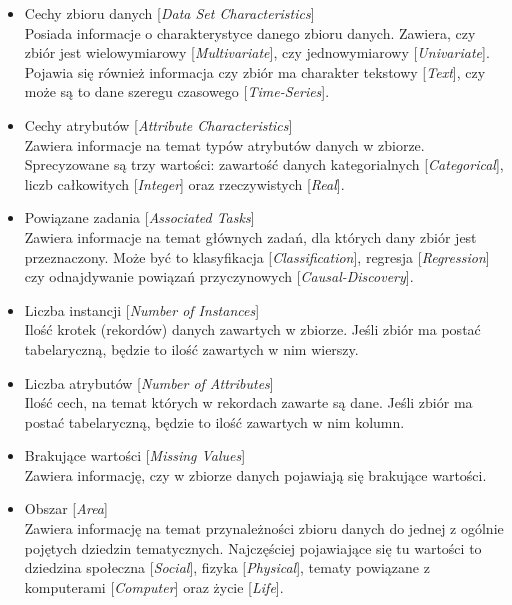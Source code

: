 \begin{itemize}
  \item Cechy zbioru danych [\emph{Data Set Characteristics}] \\
        Posiada informacje o charakterystyce danego zbioru danych.
        Zawiera, czy zbiór jest wielowymiarowy [\emph{Multivariate}], czy jednowymiarowy [\emph{Univariate}]\footnotemark.
        Pojawia się również informacja czy zbiór ma charakter tekstowy [\emph{Text}], czy może są to dane szeregu czasowego [\emph{Time-Series}].

  \item Cechy atrybutów [\emph{Attribute Characteristics}] \\
        Zawiera informacje na temat typów atrybutów danych w zbiorze.
        Sprecyzowane są trzy wartości: zawartość danych kategorialnych [\emph{Categorical}], liczb całkowitych [\emph{Integer}] oraz rzeczywistych [\emph{Real}].

  \item Powiązane zadania [\emph{Associated Tasks}] \\
        Zawiera informacje na temat głównych zadań, dla których dany zbiór jest przeznaczony.
        Może być to klasyfikacja [\emph{Classification}], regresja [\emph{Regression}] czy odnajdywanie powiązań przyczynowych [\emph{Causal-Discovery}].

  \item Liczba instancji [\emph{Number of Instances}] \\
        Ilość krotek (rekordów) danych zawartych w zbiorze.
        Jeśli zbiór ma postać tabelaryczną, będzie to ilość zawartych w nim wierszy.

  \item Liczba atrybutów [\emph{Number of Attributes}] \\
        Ilość cech, na temat których w rekordach zawarte są dane.
        Jeśli zbiór ma postać tabelaryczną, będzie to ilość zawartych w nim kolumn.

  \item Brakujące wartości [\emph{Missing Values}] \\
        Zawiera informację, czy w zbiorze danych pojawiają się brakujące wartości.

  \item Obszar [\emph{Area}] \\
        Zawiera informację na temat przynależności zbioru danych do jednej z ogólnie pojętych dziedzin tematycznych.
        Najczęściej pojawiające się tu wartości to dziedzina społeczna [\emph{Social}], fizyka [\emph{Physical}], tematy powiązane z komputerami [\emph{Computer}] oraz życie [\emph{Life}].


\end{itemize}
